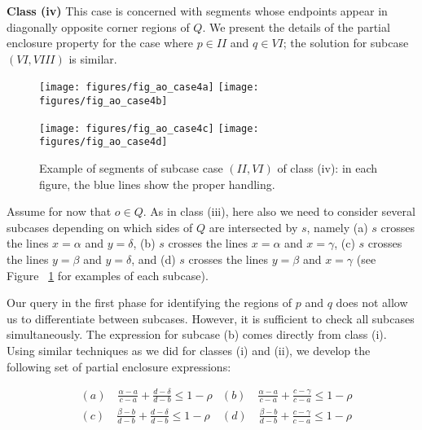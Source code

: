 {\bf Class (iv)}
This case is concerned with segments whose endpoints appear in 
diagonally opposite corner regions of $Q$. We present the details 
of the partial enclosure property for the case where $p \in II$ 
and $q \in VI$; the solution for subcase $(VI, VIII)$ is similar.

\begin{figure}[t]
\begin{center}
  \texttt{[image: figures/fig\_ao\_case4a]}
  \hspace{1.0em}
  \texttt{[image: figures/fig\_ao\_case4b]}

  \vspace{2.0em}
  
  \texttt{[image: figures/fig\_ao\_case4c]}
  \hspace{1.0em}
  \texttt{[image: figures/fig\_ao\_case4d]}

  \caption{Example of segments of subcase case $(II, VI)$ of class (iv): 
  in each figure, the blue lines show the proper handling.}
  \label{fig:rectangles:ao:case4}
\end{center}
\end{figure}

Assume for now that $o \in Q$. As in class (iii), here also we need to 
consider several subcases depending on which sides of $Q$ are 
intersected by $s$, namely (a) $s$ crosses the lines $x=\alpha$ and 
$y=\delta$, (b) $s$ crosses the lines $x=\alpha$ and $x=\gamma$, 
(c) $s$ crosses the lines $y=\beta$ and $y=\delta$, and (d)
$s$ crosses the lines $y=\beta$ and $x=\gamma$ (see Figure~
\ref{fig:rectangles:ao:case4} for examples of each subcase). 

Our query in the first phase for identifying the regions of $p$ and $q$ 
does not allow us to differentiate between subcases. However, 
it is sufficient to check all subcases simultaneously. The 
expression for subcase (b) comes directly from class (i).
Using similar techniques as we did for classes (i) and (ii), 
we develop the following set of partial enclosure expressions:

\begin{align*}
& (a) \quad \frac{\alpha - a}{c - a} + \frac{d - \delta}{d - b} \leq 1 - \rho
& (b) \quad \frac{\alpha - a}{c - a} + \frac{c - \gamma}{c - a} \leq 1 - \rho \\
& (c) \quad \frac{\beta  - b}{d - b} + \frac{d - \delta}{d - b} \leq 1 - \rho  
& (d) \quad \frac{\beta  - b}{d - b} + \frac{c - \gamma}{c - a} \leq 1 - \rho \\
\end{align*}

